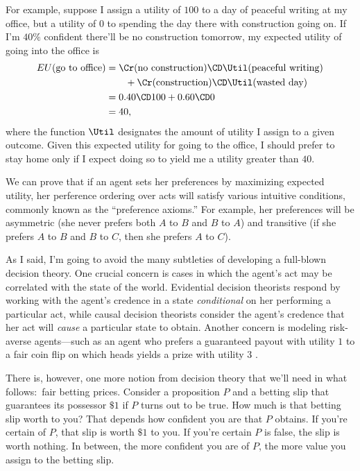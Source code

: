 For example, suppose I assign a utility of $100$ to a day of peaceful writing at my office, but a utility of $0$ to spending the day there with construction going on. If I'm $40\%$ confident there'll be no construction tomorrow, my expected utility of going into the office is
\begin{equation}
\begin{aligned}
EU(\text{go to office}) &= \Cr(\text{no construction}) \CD \Util(\text{peaceful writing})\\
                        &\qquad + \Cr(\text{construction}) \CD \Util(\text{wasted day})\\
						&= 0.40 \CD 100 + 0.60 \CD 0\\
						&= 40,
\end{aligned}
\end{equation}
where the function $\Util$ designates the amount of utility I assign to a given outcome. Given this expected utility for going to the office, I should prefer to stay home only if I expect doing so to yield me a utility greater than $40$. 

We can prove that if an agent sets her preferences by maximizing expected utility, her perference ordering over acts will satisfy various intuitive conditions, commonly known as the ``preference axioms.'' For example, her preferences will be asymmetric (she never prefers both $A$ to $B$ and $B$ to $A$) and transitive (if she prefers $A$ to $B$ and $B$ to $C$, then she prefers $A$ to $C$).

As I said, I'm going to avoid the many subtleties of developing a full-blown decision theory. One crucial concern is cases in which the agent's act may be correlated with the state of the world. Evidential decision theorists \citep{JeffreyLogic} respond by working with the agent's credence in a state \emph{conditional} on her performing a particular act, while causal decision theorists \citep{GibbardHarper,LewisCausal,JoyceCausal,WeirichCausal} consider the agent's credence that her act will \emph{cause} a particular state to obtain. Another concern is modeling risk-averse agents---such as an agent who prefers a guaranteed payout with utility $1$ to a fair coin flip on which heads yields a prize with utility $3$ \citep{Allais,BuchakRisk}.

There is, however, one more notion from decision theory that we'll need in what follows:\ fair betting prices. Consider a proposition $P$ and a betting slip that guarantees its possessor $\$1$ if $P$ turns out to be true. How much is that betting slip worth to you? That depends how confident you are that $P$ obtains. If you're certain of $P$, that slip is worth $\$1$ to you. If you're certain $P$ is false, the slip is worth nothing. In between, the more confident you are of $P$, the more value you assign to the betting slip.

